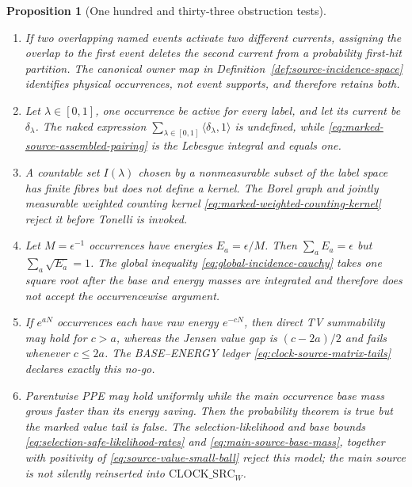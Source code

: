 \documentclass[11pt]{article}
\newtheorem{proposition}[theorem]{Proposition}
\begin{document}
\begin{proposition}[One hundred and thirty-three obstruction tests]
\begin{enumerate}[label=\textup{(T\arabic*)}]
      A global $L^p$ bound may hold for $p<3$, while the tilted conditional
      bad probability is order one.  Definition~\ref{def:kernel-reverse-holder}
      rejects this model; Lemma~\ref{lem:measurable-refinement-moments} alone
      does not.
\item If two overlapping named events activate two different currents,
      assigning the overlap to the first event deletes the second current
      from a probability first-hit partition.  The canonical owner map in
      Definition~\ref{def:source-incidence-space} identifies physical
      occurrences, not event supports, and therefore retains both.
\item Let $\lambda\in[0,1]$, one occurrence be active for every label, and
      let its current be $\delta_\lambda$.  The naked expression
      $\sum_{\lambda\in[0,1]}\langle\delta_\lambda,1\rangle$ is undefined,
      while \eqref{eq:marked-source-assembled-pairing} is the Lebesgue
      integral and equals one.
\item A countable set $I(\lambda)$ chosen by a nonmeasurable subset of the
      label space has finite fibres but does not define a kernel.  The Borel
      graph and jointly measurable weighted counting kernel
      \eqref{eq:marked-weighted-counting-kernel} reject it before Tonelli is
      invoked.
\item Let $M=\epsilon^{-1}$ occurrences have energies
      $E_a=\epsilon/M$.  Then $\sum_aE_a=\epsilon$ but
      $\sum_a\sqrt{E_a}=1$.  The global inequality
      \eqref{eq:global-incidence-cauchy} takes one square root after the base
      and energy masses are integrated and therefore does not accept the
      occurrencewise argument.
\item If $e^{aN}$ occurrences each have raw energy $e^{-cN}$, then direct TV
      summability may hold for $c>a$, whereas the Jensen value gap is
      $(c-2a)/2$ and fails whenever $c\le2a$.  The BASE--ENERGY ledger
      \eqref{eq:clock-source-matrix-tails} declares exactly this no-go.
\item Parentwise PPE may hold uniformly while the main occurrence base mass
      grows faster than its energy saving.  Then the probability theorem is
      true but the marked value tail is false.  The selection-likelihood and
      base bounds \eqref{eq:selection-safe-likelihood-rates} and
      \eqref{eq:main-source-base-mass}, together with positivity of
      \eqref{eq:source-value-small-ball} reject this model; the main source
      is not silently reinserted into $\mathrm{CLOCK\_SRC}_{W}$.

\end{enumerate}
\end{proposition}
\end{document}
